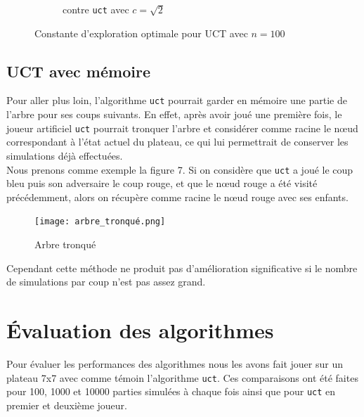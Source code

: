 \documentclass[a4paper]{article}
\theoremstyle{definition}
\begin{document}
\begin{figure}[!h]
\begin{subfigure}{0.5\textwidth}
		\caption{contre \texttt{uct} avec $c = \sqrt{2}$}
		\label{fig:3_}
	\end{subfigure}
	\caption{Constante d'exploration optimale pour UCT avec $n=100$}
	\label{fig:best-cst}
\end{figure}

\subsection{UCT avec mémoire}

Pour aller plus loin, l'algorithme \texttt{uct} pourrait garder en mémoire une partie de l'arbre pour ses coups suivants. En effet, après avoir joué une première fois, le joueur artificiel \texttt{uct} pourrait tronquer l'arbre et considérer comme racine le nœud correspondant à l'état actuel du plateau, ce qui lui permettrait de conserver les simulations déjà effectuées.\\
Nous prenons comme exemple la figure 7. Si on considère que \texttt{uct} a joué le coup bleu puis son adversaire le coup rouge,  et que le nœud rouge a été visité précédemment, alors on récupère comme racine le nœud rouge avec ses enfants.\\

\begin{figure}[h]
	\centering
	\texttt{[image: arbre\_tronqué.png]}
	\caption{Arbre tronqué}
	\label{fig:arbre-tronqué}
\end{figure}

\newpage

Cependant cette méthode ne produit pas d'amélioration significative si le nombre de simulations par coup n'est pas assez grand.

\newpage

\section{Évaluation des algorithmes}

Pour évaluer les performances des algorithmes nous les avons fait jouer sur un plateau 7x7 avec comme témoin l'algorithme \texttt{uct}. Ces comparaisons ont été faites pour 100, 1000 et 10000 parties simulées à chaque fois ainsi que pour \texttt{uct} en premier et deuxième joueur.
\end{document}
